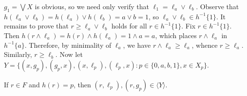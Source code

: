 \medskip

$g_1 = \bigvee X$ is obvious, so we need only verify that $\ell_1 = \ell_a \vee \ell_b$. 
Observe that $h(\ell_a \vee \ell_b) = h(\ell_a) \vee h(\ell_b) = a \vee b = 1$, so 
$\ell_a \vee \ell_b \in h^{-1}\{1\}$. It remains to prove that $r \geqslant \ell_a \vee \ell_b$ holds for all $r \in h^{-1}\{1\}$.
Fix $r \in h^{-1}\{1\}$. Then $h(r \wedge \ell_a) = h(r) \wedge h(\ell_a) = 1 \wedge a = a$, which places $r \wedge \ell_a$ in $h^{-1}\{a\}$.  Therefore, 
by minimality of $\ell_a$, we have $r \wedge \ell_a  \geqslant \ell_a$, whence 
$r\geqslant \ell_a$.  Similarly, $r\geqslant \ell_b$.
Now let $Y = \{(x, g_p), (g_p, x), (x, \ell_p),(\ell_p, x) : p \in \{0, a, b, 1\}, x \in X_p\}$.

\medskip
{} If $r \in F$ and $h(r) = p$, then $(r, \ell_p), (r, g_p) \in \langle Y \rangle$.

